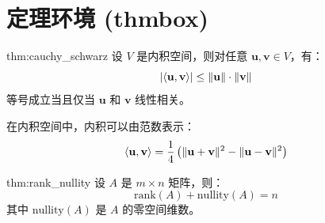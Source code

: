 \section{定理环境 (thmbox)}

\begin{thmbox}[柯西-施瓦茨不等式]{thm:cauchy_schwarz}
设 \( V \) 是内积空间，则对任意 \( \mathbf{u}, \mathbf{v} \in V \)，有：
\[
\lvert\langle \mathbf{u}, \mathbf{v} \rangle\rvert \leq \lVert\mathbf{u}\rVert \cdot \lVert\mathbf{v}\rVert
\]
等号成立当且仅当 \( \mathbf{u} \) 和 \( \mathbf{v} \) 线性相关。
\end{thmbox}

\begin{thmbox*}[极化恒等式]
在内积空间中，内积可以由范数表示：
\[
\langle \mathbf{u}, \mathbf{v} \rangle = \frac{1}{4} \left( \lVert\mathbf{u} + \mathbf{v}\rVert^2 - \lVert\mathbf{u} - \mathbf{v}\rVert^2 \right)
\]
\end{thmbox*}

\begin{thmbox}[秩-零度定理]{thm:rank_nullity}
设 \( A \) 是 \( m \times n \) 矩阵，则：
\[
\text{rank}(A) + \text{nullity}(A) = n
\]
其中 \( \text{nullity}(A) \) 是 \( A \) 的零空间维数。
\end{thmbox}